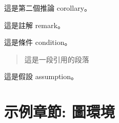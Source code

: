 \documentclass[
    writingLanguage=chinese, %
    addPageTitle=on,  %
    addDeclaration=on, %
    addMUSTlog=off, %
    addFigTOC=on, %
    addTabTOC=on, %
    refIndent=off, %
    printMod=off, %
]{.def/must}
\begin{document}
\begin{corollary}
這是第二個推論 corollary。
\end{corollary}

\begin{remark}
這是註解 remark。
\end{remark}



\begin{condition}
這是條件 condition。
\end{condition}

 \begin{quote}
     這是一段引用的段落
 \end{quote}

\begin{assumption}
這是假設 assumption。
\end{assumption}





\chapter{示例章節: 圖環境}
\end{document}
